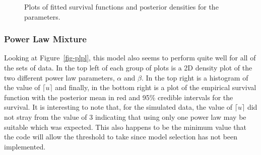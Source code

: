 \documentclass[
]{article}
\begin{document}
\begin{figure}[H]


\caption{\label{fig-pli}Plots of fitted survival functions and posterior
densities for the parameters.}

\end{figure}%

\subsubsection{Power Law Mixture}\label{power-law-mixture}

Looking at Figure~\ref{fig-plpl}, this model also seems to perform quite
well for all of the sets of data. In the top left of each group of plots
is a 2D density plot of the two different power law parameters,
\(\alpha\) and \(\beta\). In the top right is a histogram of the value
of \(\lceil u\rceil\) and finally, in the bottom right is a plot of the
empirical survival function with the posterior mean in red and 95\%
credible intervals for the survival. It is interesting to note that, for
the simulated data, the value of \(\lceil u \rceil\) did not stray from
the value of 3 indicating that using only one power law may be suitable
which was expected. This also happens to be the minimum value that the
code will allow the threshold to take since model selection has not been
implemented.
\end{document}
